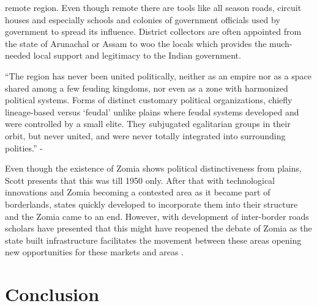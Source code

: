 \begin{sloppypar}
remote region. Even though remote there are tools like all season roads, circuit houses and especially schools and colonies of government officials used by government to spread its influence. District collectors are often appointed from the state of Arunachal or Assam to woo the locals which provides the much-needed local support and legitimacy to the Indian government.  

\vspace{0.3cm}

 \enquote{The region has never been united politically, neither as an empire nor as a space shared among a few feuding kingdoms, nor even as a zone with harmonized political systems. Forms of distinct customary political organizations, chiefly lineage-based versus \enquote{feudal} unlike plains where feudal systems developed and were controlled by a small elite. They subjugated egalitarian groups in their orbit, but never united, and were never totally integrated into surrounding polities.} - \citep{michaud2017s}

\vspace{0.3cm}

 Even though the existence of Zomia shows political distinctiveness from plains, Scott presents that this was till 1950 only. After that with technological innovations and Zomia becoming a contested area as it became part of borderlands, states quickly developed to incorporate them into their structure and the Zomia came to an end. However, with development of inter-border roads scholars have presented that this might have reopened the debate of Zomia as the state built infrastructure facilitates the movement between these areas opening new opportunities for these markets and areas \citep{murton2013himalayan}. 

 \section{Conclusion}


\end{sloppypar}
